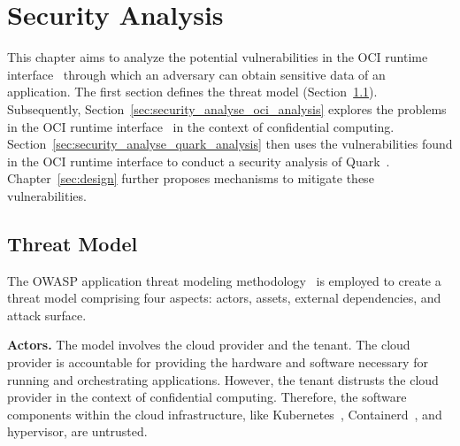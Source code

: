\chapter{Security Analysis}
\label{sec:security_analyse}




This chapter aims to analyze the potential vulnerabilities in the OCI runtime interface~\cite*{oci-runtime-spec} through which an adversary can obtain sensitive data of an application. The first section defines the threat model (Section~\ref{sec:Threat_model}). Subsequently, Section~\ref{sec:security_analyse_oci_analysis} explores the problems in the OCI runtime interface~\cite*{oci-runtime-spec} in the 
context of confidential computing. Section~\ref{sec:security_analyse_quark_analysis} then uses the vulnerabilities found in the OCI runtime interface to conduct a security analysis of Quark~\cite*{quark}. Chapter~\ref{sec:design} further proposes mechanisms to mitigate these vulnerabilities.


\section{Threat Model}
\label{sec:Threat_model}
The OWASP application threat modeling methodology~\cite*{OWASP_Threat_Modeling} is employed to create a threat model comprising four aspects: actors, assets, external dependencies, and attack surface.

\textbf{Actors.} The model involves the cloud provider and the tenant. The cloud provider is accountable for providing the hardware and software necessary for running and orchestrating applications. However, the tenant distrusts the cloud provider in the 
context of confidential computing. Therefore, the software components within the cloud infrastructure, like Kubernetes~\cite*{k8s}, Containerd~\cite*{containerd}, and hypervisor, are untrusted.

